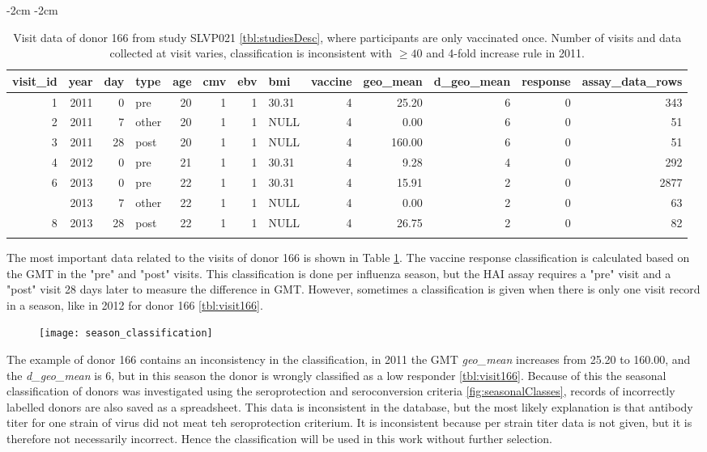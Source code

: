 \begin{table}
\addtolength{\leftskip} {-2cm} %
\addtolength{\rightskip} {-2cm} %
\begin{tabular}{rrrlrrrlrrrrr}
\toprule{}
visit\_id & year & day & type & age & cmv & ebv & bmi & vaccine & geo\_mean & d\_geo\_mean & response & assay\_data\_rows\\
\midrule{}
1 & 2011 & 0 & pre & 20 & 1 & 1 & 30.31 & 4 & 25.20 & 6 & 0 & 343\\
2 & 2011 & 7 & other & 20 & 1 & 1 & NULL & 4 & 0.00 & 6 & 0 & 51\\
3 & 2011 & 28 & post & 20 & 1 & 1 & NULL & 4 & 160.00 & 6 & 0 & 51\\
4 & 2012 & 0 & pre & 21 & 1 & 1 & 30.31 & 4 & 9.28 & 4 & 0 & 292\\
6 & 2013 & 0 & pre & 22 & 1 & 1 & 30.31 & 4 & 15.91 & 2 & 0 & 2877\\
\addlinespace
7 & 2013 & 7 & other & 22 & 1 & 1 & NULL & 4 & 0.00 & 2 & 0 & 63\\
8 & 2013 & 28 & post & 22 & 1 & 1 & NULL & 4 & 26.75 & 2 & 0 & 82\\
\bottomrule{}
\end{tabular}
\caption{Visit data of donor 166 from study SLVP021 \autoref{tbl:studiesDesc},
where participants are only vaccinated once.
Number of visits and data collected at visit varies, classification is
inconsistent with \( \geq 40\) and 4-fold increase
rule in 2011.}\label{tbl:visit166}
\end{table}

The most important data related to the visits of donor 166 is shown in Table
\ref{tbl:visit166}.  The vaccine response classification is calculated based on
the GMT in the "pre" and "post" visits.  This classification is done per
influenza season, but the HAI assay requires a "pre" visit and a "post" visit
28 days later to measure the difference in GMT.  However, sometimes a
classification is given when there is only one visit record in a season, like
in 2012 for donor 166 \autoref{tbl:visit166}.

\begin{figure}
    \texttt{[image: season\_classification]}
    \caption{}\label{fig:classInconsistent}
\end{figure}

The example of donor 166 contains an inconsistency in the classification, in
2011 the GMT \textit{geo\_mean} increases from 25.20 to 160.00, and the
\textit{d\_geo\_mean} is 6, but in this season the donor is wrongly classified
as a low responder \autoref{tbl:visit166}. Because of this the seasonal
classification of donors was investigated using the seroprotection and
seroconversion criteria \ref{fig:seasonalClasses}, records of incorrectly
labelled donors are also saved as a spreadsheet. This data is inconsistent in
the database, but the most likely explanation is that antibody titer for one
strain of virus did not meat teh seroprotection criterium. It is inconsistent
because per strain titer data is not given, but it is therefore not necessarily
incorrect. Hence the classification will be used in this work without further
selection.


